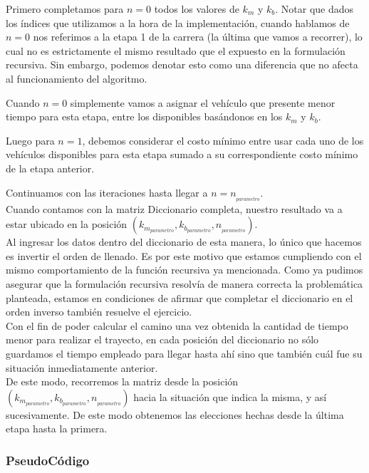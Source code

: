 Primero completamos para $n=0$ todos los valores de $k_m$ y $k_b$. Notar que dados los \'indices que utilizamos a la hora de la implementaci\'on, cuando hablamos de $n=0$ nos referimos a la etapa 1 de la carrera (la \'ultima que vamos a recorrer), lo cual no es estrictamente el mismo resultado que el expuesto en la formulaci\'on recursiva. Sin embargo, podemos denotar esto como una diferencia que no afecta al funcionamiento del algoritmo.

Cuando $n=0$ simplemente vamos a asignar el veh\'iculo que presente menor tiempo para esta etapa, entre los disponibles bas\'andonos en los $k_m$ y $k_b$.

Luego para $n=1$, debemos considerar el costo m\'inimo entre usar cada uno de los veh\'iculos disponibles para esta etapa sumado a su correspondiente costo m\'inimo de la etapa anterior.

Continuamos con las iteraciones hasta llegar a $n=n_{_{parametro}}$.\\

Cuando contamos con la matriz Diccionario completa, nuestro resultado va a estar ubicado en la posici\'on $(k_{m_{parametro}},k_{b_{parametro}},n_{_{parametro}})$.\\

Al ingresar los datos dentro del diccionario de esta manera, lo \'unico que hacemos es invertir el orden de llenado. Es por este motivo que estamos cumpliendo con el mismo comportamiento de la funci\'on recursiva ya mencionada. Como ya pudimos asegurar que la formulaci\'on recursiva resolv\'ia de manera correcta la problem\'atica planteada, estamos en condiciones de afirmar que completar el diccionario en el orden inverso tambi\'en resuelve el ejercicio.\\

Con el fin de poder calcular el camino una vez obtenida la cantidad de tiempo menor para realizar el trayecto, en cada posici\'on del diccionario no s\'olo guardamos el tiempo empleado para llegar hasta ah\'i sino que tambi\'en cu\'al fue su situaci\'on inmediatamente anterior.\\

De este modo, recorremos la matriz  desde la posici\'on $(k_{m_{parametro}},k_{b_{parametro}},n_{_{parametro}})$ hacia la situaci\'on que indica la misma, y as\'i sucesivamente. De este modo obtenemos las elecciones hechas desde la \'ultima etapa hasta la primera.

\subsubsection*{PseudoC\'odigo}

